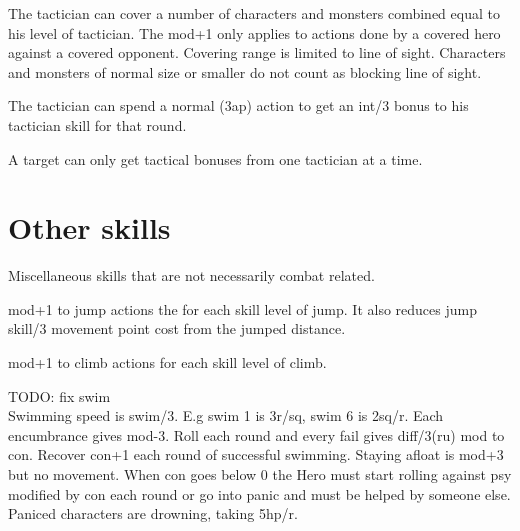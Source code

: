 The tactician can cover a number of characters and monsters combined equal to his level of tactician. The mod+1 only applies to actions done by a covered hero against a covered opponent. Covering range is limited to line of sight. Characters and monsters of normal size or smaller do not count as blocking line of sight.

The tactician can spend a normal (3ap) action to get an int/3 bonus to his tactician skill for that round.

A target can only get tactical bonuses from one tactician at a time.





\closeskillslist
















\section*{Other skills}

Miscellaneous skills that are not necessarily combat related.



\openskillslist



 mod+1 to jump actions the for each skill level of jump. It also reduces jump skill/3 movement point cost from the jumped distance.


 mod+1 to climb actions for each skill level of climb.


 TODO: fix swim \\
Swimming speed is swim/3. E.g swim 1 is 3r/sq, swim 6 is 2sq/r. Each encumbrance gives mod-3. Roll each round and every fail gives diff/3(ru) mod to con. Recover con+1 each round of successful swimming. Staying afloat is mod+3 but no movement. When con goes below 0 the Hero must start rolling against psy modified by con each round or go into panic and must be helped by someone else. Paniced characters are drowning, taking 5hp/r.


